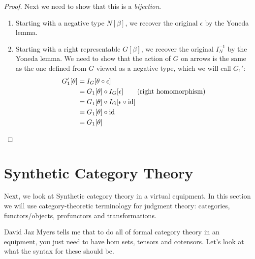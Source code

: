 \documentclass{article}
\begin{document}
\begin{proof}
  Next we need to show that this is a \emph{bijection}.
  \begin{enumerate}
  \item Starting with a negative type $N[\beta]$, we recover the
    original $\epsilon$ by the Yoneda lemma.
  \item Starting with a right representable $G[\beta]$, we recover the
    original $I_N^{-1}$ by the Yoneda lemma. We need to show that the
    action of $G$ on arrows is the same as the one defined from $G$
    viewed as a negative type, which we will call $G_1'$:
    \begin{align*}
      G_1'[\theta] &= I_G[\theta \circ \epsilon]\\
      &= G_1[\theta] \circ I_G[\epsilon]\tag{right homomorphism}\\
      &= G_1[\theta] \circ I_G[\epsilon \circ \text{id}]\\
      &= G_1[\theta] \circ \text{id}\\
      &= G_1[\theta]
    \end{align*}
  \end{enumerate}
\end{proof}

\section{Synthetic Category Theory}

Next, we look at Synthetic category theory in a virtual equipment. In
this section we will use category-theoretic terminology for judgment
theory: categories, functors/objects, profunctors and transformations.

David Jaz Myers tells me that to do all of formal category theory in
an equipment, you just need to have hom sets, tensors and cotensors.
%
Let's look at what the syntax for these should be.
\end{document}
